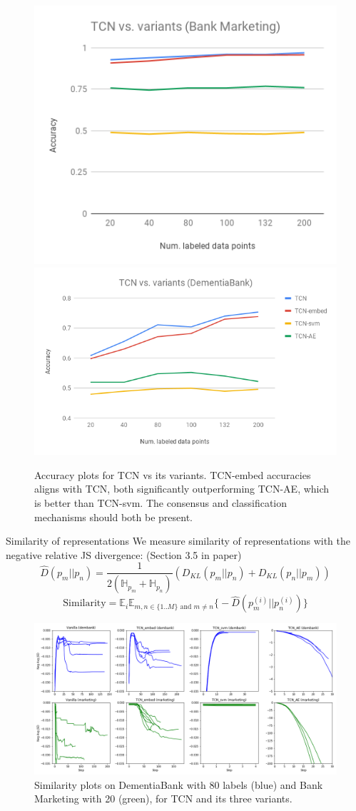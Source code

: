 \documentclass[final]{beamer}
\newlength{\onecolwid}
\begin{document}
\begin{frame}[t]
\begin{columns}[t]
\begin{column}{\onecolwid}
\begin{figure}[h]
    \includegraphics[width=.42\textwidth]{images/accuracy_variants_bm.png}
    \includegraphics[width=.58\textwidth]{images/accuracy_variants_db.png}
    \caption{Accuracy plots for TCN vs its variants. TCN-embed accuracies aligns with TCN, both significantly outperforming TCN-AE, which is better than TCN-svm. The consensus and classification mechanisms should both be present.}
    \label{fig:accuracy_tcn_vs_variants}
\end{figure}


\begin{block}{Similarity of representations}
We measure similarity of representations with the negative relative JS divergence: (Section 3.5 in paper)
\[\hat{D}(p_m || p_n) = \frac{1}{2(\mathbb{H}_{p_m} +  \mathbb{H}_{p_n})} (D_{KL}(p_m || p_n) + D_{KL}(p_n || p_m))\]
\[ \displaystyle \text{Similarity} = \mathbb{E}_i \mathbb{E}_{m,n\in \{1..M\} \text{ and } m\neq n} \big \{-\hat{D}(p_m^{(i)} || p_n^{(i)}) \big \} \]

\begin{figure}
    \centering
    \includegraphics[width=.9\textwidth]{images/tcn_collective_rmi.png}
    \caption{Similarity plots on DementiaBank with 80 labels (blue) and Bank Marketing with 20 (green), for TCN and its three variants.}
    \label{fig:my_label}
\end{figure}
\end{block}



\end{column}
\end{columns}
\end{frame}
\end{document}
